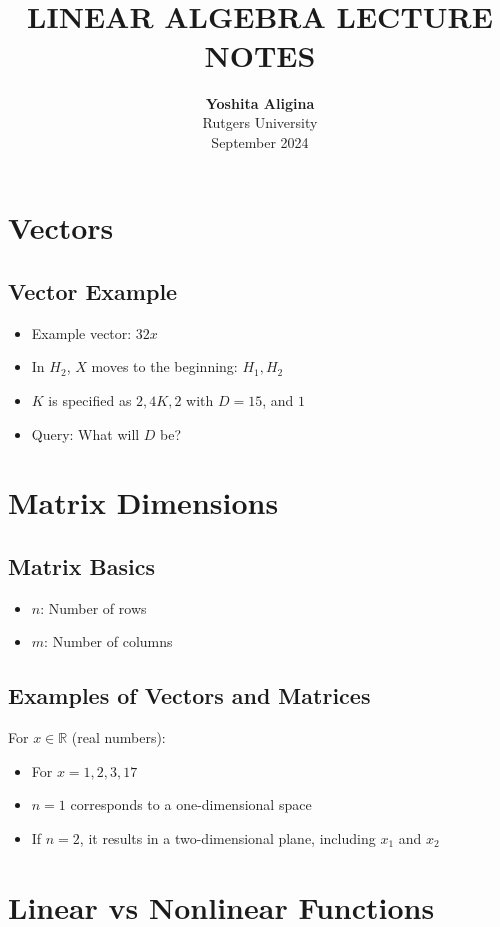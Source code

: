 \documentclass{article}
\title{ \normalsize \textsc{}
		\\ [2.0cm]
		\HRule{1.5pt} \\
		\LARGE \textbf{\uppercase{Linear Algebra Lecture Notes}}
		\HRule{2.0pt} \\ [0.6cm]  \vspace*{10\baselineskip}
		}
\date{}
\author{\textbf{Yoshita Aligina} \\ 
		Rutgers University \\ 
		September 2024}
\begin{document}
\maketitle
\newpage

\tableofcontents
\newpage

\section{Vectors}

\subsection{Vector Example}
\begin{itemize}
    \item Example vector: $32x$
    \item In $H_2$, $X$ moves to the beginning: $H_1, H_2$
    \item $K$ is specified as $2, 4K, 2$ with $D = 15$, and $1$
    \item Query: What will $D$ be?
\end{itemize}

\section{Matrix Dimensions}

\subsection{Matrix Basics}
\begin{itemize}
    \item $n$: Number of rows
    \item $m$: Number of columns
\end{itemize}

\subsection{Examples of Vectors and Matrices}
For $x \in \mathbb{R}$ (real numbers):
\begin{itemize}
    \item For $x = 1, 2, 3, 17$
    \item $n=1$ corresponds to a one-dimensional space
    \item If $n=2$, it results in a two-dimensional plane, including $x_1$ and $x_2$
\end{itemize}

\section{Linear vs Nonlinear Functions}
\end{document}
